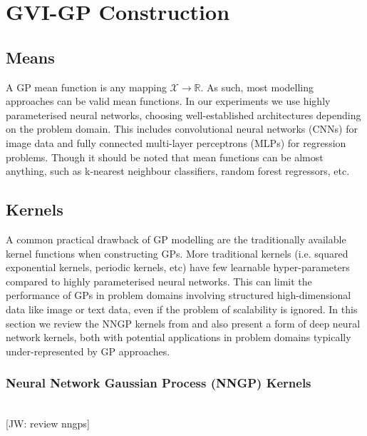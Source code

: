 \documentclass{article}
\newcommand{\jw}[1]{{\color{gray} [JW: #1]}}
\numberwithin{equation}{section}
\begin{document}
\newpage
\section{GVI-GP Construction}\label{section:gvi-gp-construction}
\subsection{Means}
A GP mean function is any mapping $\mathcal{X} \rightarrow \mathbb{R}$. As such, most modelling approaches can be valid mean functions. In our experiments we use highly parameterised neural networks, choosing well-established architectures depending on the problem domain. This includes convolutional neural networks (CNNs) for image data and fully connected multi-layer perceptrons (MLPs) for regression problems. Though it should be noted that mean functions can be almost anything, such as k-nearest neighbour classifiers, random forest regressors, etc.

\subsection{Kernels}\label{section:kernels}
A common practical drawback of GP modelling are the traditionally available kernel functions when constructing GPs. More traditional kernels (i.e. squared exponential kernels, periodic kernels, etc) have few learnable hyper-parameters compared to highly parameterised neural networks. This can limit the performance of GPs in problem domains involving structured high-dimensional data like image or text data, even if the problem of scalability is ignored. In this section we review the NNGP kernels from \cite{novak2019neural} and also present a form of deep neural network kernels, both with potential applications in problem domains typically under-represented by GP approaches.

\subsubsection{Neural Network Gaussian Process (NNGP) Kernels}
\\\jw{review nngps}
\end{document}
